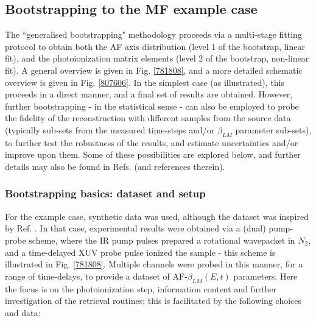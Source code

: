\documentclass[10pt]{article}
\begin{document}
\subsection{Bootstrapping to the MF example case\label{sec:bootstrapping}}


The ``generalised bootstrapping" methodology proceeds via a multi-stage fitting protocol to obtain both the AF axis distribution (level 1 of the bootstrap, linear fit), and the photoionization matrix elements (level 2 of the bootstrap, non-linear fit). A general overview is given in Fig. \ref{781808}, and a more detailed schematic overview is given in Fig. \ref{807606}. In the simplest case (as illustrated), this proceeds in a direct manner, and a final set of results are obtained. However, further bootstrapping - in the statistical sense - can also be employed to probe the fidelity of the reconstruction with different samples from the source data (typically sub-sets from the measured time-steps and/or $\beta_{LM}$ parameter sub-sets), to further test the robustness of the results, and estimate uncertainties and/or improve upon them. Some of these possibilities are explored below, and further details may also be found in Refs. \cite{hockett2018QMP1,hockett2018QMP2,marceau2017MolecularFrameReconstruction} (and references therein).





\subsubsection{Bootstrapping basics: dataset and setup}

For the example case, synthetic data was used, although the dataset was inspired by Ref. \cite{marceau2017MolecularFrameReconstruction}. In that case, experimental results were obtained via a (dual) pump-probe scheme, where the IR pump pulses prepared a rotational wavepacket in $N_2$, and a time-delayed XUV probe pulse ionized the sample - this scheme is illustrated in Fig. \ref{781808}. Multiple channels were probed in this manner, for a range of time-delays, to provide a dataset of AF-$\beta_{LM}(E,t)$ parameters. Here the focus is on the photoionization step, information content and further investigation of the retrieval routines; this is facilitated by the following choices and data:
\end{document}
